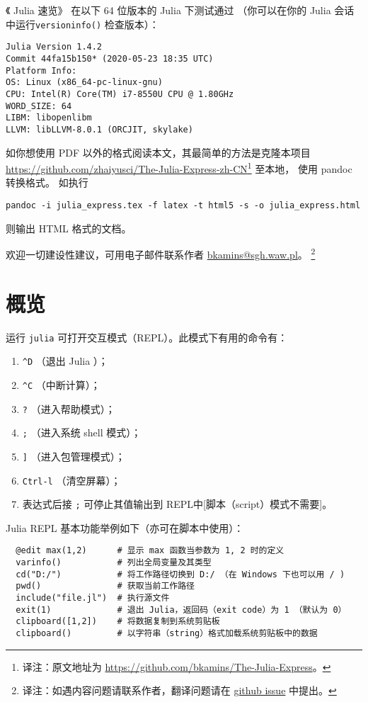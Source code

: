 \documentclass[10pt,a4paper]{article}
\begin{document}
《 Julia 速览》 在以下 64 位版本的 Julia 下测试通过
（你可以在你的 Julia 会话中运行\lstinline|versioninfo()| 检查版本）：
\begin{lstlisting}
Julia Version 1.4.2
Commit 44fa15b150* (2020-05-23 18:35 UTC)
Platform Info:
OS: Linux (x86_64-pc-linux-gnu)
CPU: Intel(R) Core(TM) i7-8550U CPU @ 1.80GHz
WORD_SIZE: 64
LIBM: libopenlibm
LLVM: libLLVM-8.0.1 (ORCJIT, skylake)
\end{lstlisting}

如你想使用 PDF 以外的格式阅读本文，其最简单的方法是克隆本项目
\sloppy\url{https://github.com/zhaiyusci/The-Julia-Express-zh-CN}\footnote{译注：原文地址为 \url{https://github.com/bkamins/The-Julia-Express}。}
至本地，
使用 pandoc 转换格式。
如执行
\begin{lstlisting}
pandoc -i julia_express.tex -f latex -t html5 -s -o julia_express.html
\end{lstlisting}
则输出 HTML 格式的文档。

欢迎一切建设性建议，可用电子邮件联系作者 \href{mailto:bkamins@sgh.waw.pl}{bkamins@sgh.waw.pl}。
\footnote{译注：如遇内容问题请联系作者，翻译问题请在 \href{https://github.com/zhaiyusci/The-Julia-Express-zh-CN/issues}{github issue} 中提出。}

\section{概览}

运行 \lstinline|julia| 可打开交互模式（REPL）。此模式下有用的命令有：
\begin{enumerate}[label=\arabic*),nolistsep]
  \item \lstinline|^D| （退出 Julia ）；
  \item \lstinline|^C| （中断计算）；
  \item \lstinline|?| （进入帮助模式）；
  \item \lstinline|;| （进入系统 shell 模式）；
  \item \lstinline|]| （进入包管理模式）；
  \item \lstinline|Ctrl-l| （清空屏幕）；
  \item 表达式后接 \lstinline|;| 可停止其值输出到 REPL中[脚本（script）模式不需要]。
\end{enumerate}

Julia REPL 基本功能举例如下（亦可在脚本中使用）：
\begin{lstlisting}
  @edit max(1,2)      # 显示 max 函数当参数为 1, 2 时的定义
  varinfo()           # 列出全局变量及其类型
  cd("D:/")           # 将工作路径切换到 D:/ （在 Windows 下也可以用 / )
  pwd()               # 获取当前工作路径
  include("file.jl")  # 执行源文件
  exit(1)             # 退出 Julia，返回码（exit code）为 1 （默认为 0）
  clipboard([1,2])    # 将数据复制到系统剪贴板
  clipboard()         # 以字符串（string）格式加载系统剪贴板中的数据
\end{lstlisting}
\end{document}
